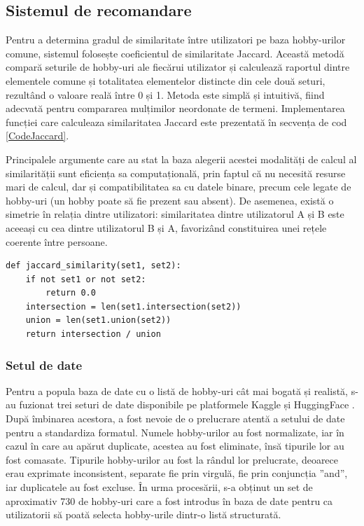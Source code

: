 \subsection{Sistemul de recomandare}
\label{subsec:ch4sec1sub3}
Pentru a determina gradul de similaritate între utilizatori pe baza hobby-urilor comune, sistemul folosește coeficientul de similaritate Jaccard.
Această metodă compară seturile de hobby-uri ale fiecărui utilizator și calculează raportul dintre elementele comune și totalitatea elementelor distincte din cele două seturi, rezultând o valoare reală între 0 și 1.
Metoda este simplă și intuitivă, fiind adecvată pentru compararea mulțimilor neordonate de termeni.
Implementarea funcției care calculeaza similaritatea Jaccard este prezentată în secvența de cod \ref{CodeJaccard}.
\par
Principalele argumente care au stat la baza alegerii acestei modalități de calcul al similarității sunt eficiența sa computațională, prin faptul că nu necesită resurse mari de calcul, dar și compatibilitatea sa cu datele binare, precum cele legate de hobby-uri (un hobby poate să fie prezent sau absent).
De asemenea, există o simetrie în relația dintre utilizatori: similaritatea dintre utilizatorul A și B este aceeași cu cea dintre utilizatorul B și A, favorizând constituirea unei rețele coerente între persoane.

\begin{lstlisting}[caption={Algoritmul de calcul al similarității Jaccard}, label={CodeJaccard}]
def jaccard_similarity(set1, set2):
    if not set1 or not set2:
        return 0.0
    intersection = len(set1.intersection(set2))
    union = len(set1.union(set2))
    return intersection / union
\end{lstlisting}    

\subsubsection*{Setul de date}
Pentru a popula baza de date cu o listă de hobby-uri cât mai bogată și realistă, s-au fuzionat trei seturi de date disponibile pe platformele Kaggle \cite{kaggle_Raj, kaggle_dawid} și HuggingFace \cite{hf_Ugurcan}.
După îmbinarea acestora, a fost nevoie de o prelucrare atentă a setului de date pentru a standardiza formatul.
Numele hobby-urilor au fost normalizate, iar în cazul în care au apărut duplicate, acestea au fost eliminate, însă tipurile lor au fost comasate.
Tipurile hobby-urilor au fost la rândul lor prelucrate, deoarece erau exprimate inconsistent, separate fie prin virgulă, fie prin conjuncția ”and”, iar duplicatele au fost excluse.
În urma procesării, s-a obținut un set de aproximativ 730 de hobby-uri care a fost introdus în baza de date pentru ca utilizatorii să poată selecta hobby-urile dintr-o listă structurată.

